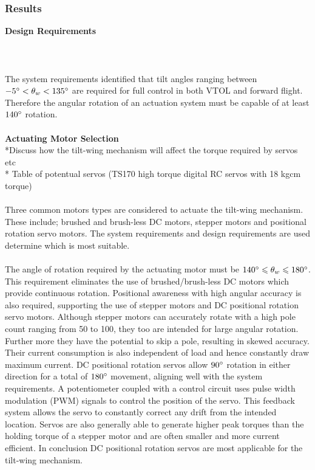 \subsubsection{Results} 
\textbf{Design Requirements}\\
\\
\\
\\
The system requirements identified that tilt angles ranging between \(-5\degree<\theta_w<135\degree\) are required for full control in both VTOL and forward flight. Therefore the angular rotation of an actuation system must be capable of at least \(140\degree\) rotation.  \\
\\
\textbf{Actuating Motor Selection}\\
*Discuss how the tilt-wing mechanism will affect the torque required by servos etc\\
* Table of potentual servos (TS170 high torque digital RC servos with 18 kgcm torque) \\
\\
Three common motors types are considered to actuate the tilt-wing mechanism. These include; brushed and brush-less DC motors, stepper motors and positional rotation servo motors. The system requirements and design requirements are used determine which is most suitable.\\
\\
The angle of rotation required by the actuating motor must be \(140\degree\leqslant\theta_w\leqslant180\degree\). This requirement eliminates the use of brushed/brush-less DC motors which provide continuous rotation. Positional awareness with high angular accuracy is also required, supporting the use of stepper motors and DC positional rotation servo motors. Although stepper motors can accurately rotate with a high pole count ranging from 50 to 100, they too are intended for large angular rotation. Further more they have the potential to skip a pole, resulting in skewed accuracy. Their current consumption is also independent of load and hence constantly draw maximum current. DC positional rotation servos allow \(90\degree\) rotation in either direction for a total of \(180\degree\) movement, aligning well with the system requirements. A potentiometer coupled with a control circuit uses pulse width modulation (PWM) signals to control the position of the servo. This feedback system allows the servo to constantly correct any drift from the intended location. Servos are also generally able to generate higher peak torques than the holding torque of a stepper motor and are often smaller and more current efficient. In conclusion DC positional rotation servos are most applicable for the tilt-wing mechanism. \\
